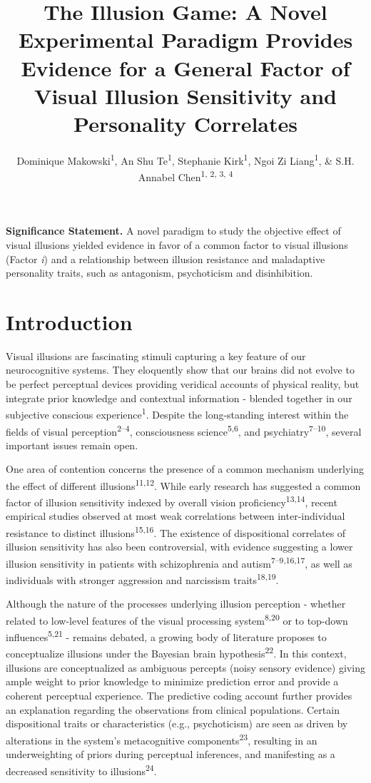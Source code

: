 \documentclass[
  man,floatsintext]{apa6}
\title{\textbf{The Illusion Game: A Novel Experimental Paradigm Provides Evidence for a General Factor of Visual Illusion Sensitivity and Personality Correlates}}
\author{Dominique Makowski\textsuperscript{1}, An Shu Te\textsuperscript{1}, Stephanie Kirk\textsuperscript{1}, Ngoi Zi Liang\textsuperscript{1}, \& S.H. Annabel Chen\textsuperscript{1, 2, 3, 4}}
\date{}
\affiliation{\vspace{0.5cm}\textsuperscript{1} School of Social Sciences, Nanyang Technological University, Singapore\\\textsuperscript{2} LKC Medicine, Nanyang Technological University, Singapore\\\textsuperscript{3} National Institute of Education, Singapore\\\textsuperscript{4} Centre for Research and Development in Learning, Nanyang Technological University, Singapore}
\begin{document}
\maketitle

\textbf{Significance Statement.} A novel paradigm to study the objective effect of visual illusions yielded evidence in favor of a common factor to visual illusions (Factor \emph{i}) and a relationship between illusion resistance and maladaptive personality traits, such as antagonism, psychoticism and disinhibition.

\hypertarget{introduction}{%
\section{Introduction}\label{introduction}}

Visual illusions are fascinating stimuli capturing a key feature of our neurocognitive systems. They eloquently show that our brains did not evolve to be perfect perceptual devices providing veridical accounts of physical reality, but integrate prior knowledge and contextual information - blended together in our subjective conscious experience\textsuperscript{1}. Despite the long-standing interest within the fields of visual perception\textsuperscript{2--4}, consciousness science\textsuperscript{5,6}, and psychiatry\textsuperscript{7--10}, several important issues remain open.

One area of contention concerns the presence of a common mechanism underlying the effect of different illusions\textsuperscript{11,12}. While early research has suggested a common factor of illusion sensitivity indexed by overall vision proficiency\textsuperscript{13,14}, recent empirical studies observed at most weak correlations between inter-individual resistance to distinct illusions\textsuperscript{15,16}. The existence of dispositional correlates of illusion sensitivity has also been controversial, with evidence suggesting a lower illusion sensitivity in patients with schizophrenia and autism\textsuperscript{7--9,16,17}, as well as individuals with stronger aggression and narcissism traits\textsuperscript{18,19}.

Although the nature of the processes underlying illusion perception - whether related to low-level features of the visual processing system\textsuperscript{8,20} or to top-down influences\textsuperscript{5,21} - remains debated, a growing body of literature proposes to conceptualize illusions under the Bayesian brain hypothesis\textsuperscript{22}. In this context, illusions are conceptualized as ambiguous percepts (noisy sensory evidence) giving ample weight to prior knowledge to minimize prediction error and provide a coherent perceptual experience. The predictive coding account further provides an explanation regarding the observations from clinical populations. Certain dispositional traits or characteristics (e.g., psychoticism) are seen as driven by alterations in the system's metacognitive components\textsuperscript{23}, resulting in an underweighting of priors during perceptual inferences, and manifesting as a decreased sensitivity to illusions\textsuperscript{24}.
\end{document}
